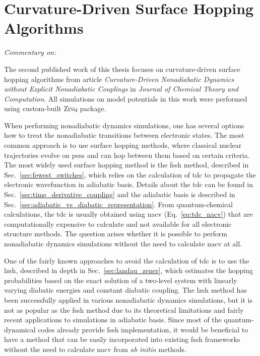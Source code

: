 \section{Curvature-Driven Surface Hopping Algorithms}\label{sec:curvature_driven_surface_hopping_algorithms}
\textit{Commentary on: }

The second published work of this thesis focuses on curvature-driven surface hopping algorithms from article \textit{Curvature-Driven Nonadiabatic Dynamics without Explicit Nonadiabatic Couplings} in \textit{Journal of Chemical Theory and Computation}. All simulations on model potentials in this work were performed using custom-built \textsc{Zinq} package.\supercite{10.5281/zenodo.18386143}

When performing nonadiabatic dynamics simulations, one has several options how to treat the nonadiabatic transitions between electronic states. The most common approach is to use surface hopping methods, where classical nuclear trajectories evolve on \glspl{pes} and can hop between them based on certain criteria. The most widely used surface hopping method is the \gls{fssh} method, described in Sec.~\ref{sec:fewest_switches}, which relies on the calculation of \gls{tdc} to propagate the electronic wavefunction in adiabatic basis. Details about the \gls{tdc} can be found in Sec.~\ref{sec:time_derivative_coupling} and the adiabatic basis is described in Sec.~\ref{sec:adiabatic_vs_diabatic_representation}. From quantum-chemical calculations, the \gls{tdc} is usually obtained using \gls{nacv} (Eq.~\eqref{eq:tdc_nacv}) that are computationally expensive to calculate and not available for all electronic structure methods. The question arises whether it is possible to perform nonadiabatic dynamics simulations without the need to calculate \gls{nacv} at all.

One of the fairly known approaches to avoid the calculation of \gls{tdc} is to use the \gls{lzsh}, described in depth in Sec.~\ref{sec:landau_zener}, which estimates the hopping probabilities based on the exact solution of a two-level system with linearly varying diabatic energies and constant diabatic coupling. The \gls{lzsh} method has been successfully applied in various nonadiabatic dynamics simulations, but it is not as popular as the \gls{fssh} method due to its theoretical limitations and fairly recent applications to simulations in adiabatic basis. Since most of the quantum-dynamical codes already provide \gls{fssh} implementation, it would be beneficial to have a method that can be easily incorporated into existing \gls{fssh} frameworks without the need to calculate \gls{nacv} from \textit{ab initio} methods.

